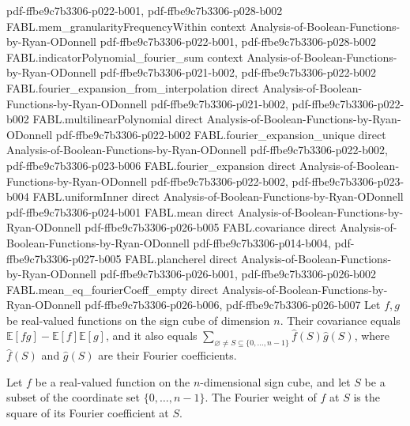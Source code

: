 \begin{theorem}
  {pdf-ffbe9c7b3306-p022-b001,
    pdf-ffbe9c7b3306-p028-b002}
\proofstep
  {FABL.mem_granularityFrequencyWithin}
  {context}
  {Analysis-of-Boolean-Functions-by-Ryan-ODonnell}
  {pdf-ffbe9c7b3306-p022-b001,
    pdf-ffbe9c7b3306-p028-b002}
\proofstep
  {FABL.indicatorPolynomial_fourier_sum}
  {context}
  {Analysis-of-Boolean-Functions-by-Ryan-ODonnell}
  {pdf-ffbe9c7b3306-p021-b002,
    pdf-ffbe9c7b3306-p022-b002}
\proofstep
  {FABL.fourier_expansion_from_interpolation}
  {direct}
  {Analysis-of-Boolean-Functions-by-Ryan-ODonnell}
  {pdf-ffbe9c7b3306-p021-b002,
    pdf-ffbe9c7b3306-p022-b002}
\proofstep
  {FABL.multilinearPolynomial}
  {direct}
  {Analysis-of-Boolean-Functions-by-Ryan-ODonnell}
  {pdf-ffbe9c7b3306-p022-b002}
\proofstep
  {FABL.fourier_expansion_unique}
  {direct}
  {Analysis-of-Boolean-Functions-by-Ryan-ODonnell}
  {pdf-ffbe9c7b3306-p022-b002,
    pdf-ffbe9c7b3306-p023-b006}
\proofstep
  {FABL.fourier_expansion}
  {direct}
  {Analysis-of-Boolean-Functions-by-Ryan-ODonnell}
  {pdf-ffbe9c7b3306-p022-b002,
    pdf-ffbe9c7b3306-p023-b004}
\proofstep
  {FABL.uniformInner}
  {direct}
  {Analysis-of-Boolean-Functions-by-Ryan-ODonnell}
  {pdf-ffbe9c7b3306-p024-b001}
\proofstep
  {FABL.mean}
  {direct}
  {Analysis-of-Boolean-Functions-by-Ryan-ODonnell}
  {pdf-ffbe9c7b3306-p026-b005}
\proofstep
  {FABL.covariance}
  {direct}
  {Analysis-of-Boolean-Functions-by-Ryan-ODonnell}
  {pdf-ffbe9c7b3306-p014-b004,
    pdf-ffbe9c7b3306-p027-b005}
\proofstep
  {FABL.plancherel}
  {direct}
  {Analysis-of-Boolean-Functions-by-Ryan-ODonnell}
  {pdf-ffbe9c7b3306-p026-b001,
    pdf-ffbe9c7b3306-p026-b002}
\proofstep
  {FABL.mean_eq_fourierCoeff_empty}
  {direct}
  {Analysis-of-Boolean-Functions-by-Ryan-ODonnell}
  {pdf-ffbe9c7b3306-p026-b006,
    pdf-ffbe9c7b3306-p026-b007}
Let $f,g$ be real-valued functions on the sign cube of dimension $n$. Their covariance
equals $\mathbb E[fg]-\mathbb E[f]\mathbb E[g]$, and it also equals
$\sum_{\varnothing\ne S\subseteq\{0,\ldots,n-1\}}\widehat f(S)\widehat g(S)$, where
$\widehat f(S)$ and $\widehat g(S)$ are their Fourier coefficients.
\end{theorem}

\begin{definition}
\label{FABL.fourierWeight}
\leanok
{}
Let $f$ be a real-valued function on the $n$-dimensional sign cube, and let $S$ be a
subset of the coordinate set $\{0,\ldots,n-1\}$. The Fourier weight of $f$ at $S$ is the
square of its Fourier coefficient at $S$.
\end{definition}


